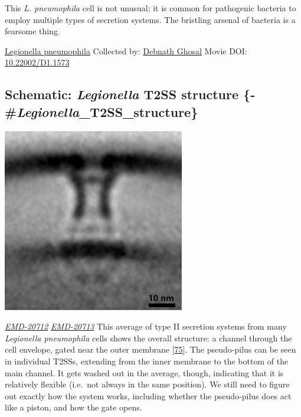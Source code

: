 \documentclass[]{tufte-book}
\begin{document}
This \emph{L. pneumophila} cell is not unusual; it is common for pathogenic bacteria to employ multiple types of secretion systems. The bristling arsenal of bacteria is a fearsome thing.



\hypertarget{htmlwidget-2e0d37c031f9a1943b7b}{}

\label{fig:9-3}\protect\hyperlink{tree}{Legionella pneumophila} Collected by: \protect\hyperlink{debnath_ghosal}{Debnath Ghosal} Movie DOI: \href{https://doi.org/10.22002/D1.1573}{10.22002/D1.1573}

\hypertarget{schematic-legionella-t2ss-structure--legionella_t2ss_structure}{%
\subsection{\texorpdfstring{Schematic: \emph{Legionella} T2SS structure \{-\#\emph{Legionella}\_T2SS\_structure\}}{Schematic: Legionella T2SS structure \{-\#Legionella\_T2SS\_structure\}}}\label{schematic-legionella-t2ss-structure--legionella_t2ss_structure}}

\includegraphics{img/schematics/9_3_1}

\href{https://www.ebi.ac.uk/pdbe/entry/emdb/EMD-20712}{\emph{EMD-20712}} \href{https://www.ebi.ac.uk/pdbe/entry/emdb/EMD-20713}{\emph{EMD-20713}}
This average of type II secretion systems from many \emph{Legionella pneumophila} cells shows the overall structure: a channel through the cell envelope, gated near the outer membrane {[}\protect\hyperlink{ref-ghosal2019}{75}{]}. The pseudo-pilus can be seen in individual T2SSs, extending from the inner membrane to the bottom of the main channel. It gets washed out in the average, though, indicating that it is relatively flexible (i.e.~not always in the same position). We still need to figure out exactly how the system works, including whether the pseudo-pilus does act like a piston, and how the gate opens.
\end{document}
